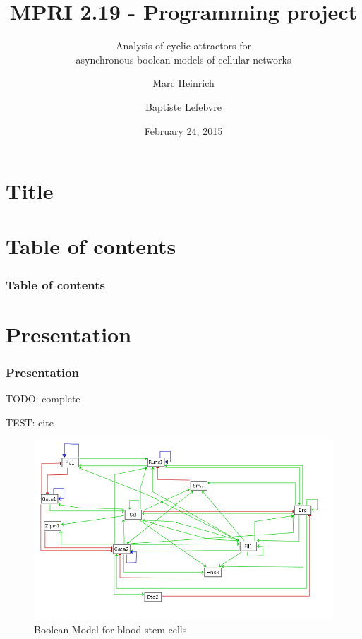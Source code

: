 \documentclass{beamer}
\title{MPRI 2.19 - Programming project}
\subtitle{Analysis of cyclic attractors for \\ asynchronous boolean models of cellular networks}
\author{Marc Heinrich \and Baptiste Lefebvre}
\institute{École Normale Supérieure, Computer Science Department}
\date{February 24, 2015}
\begin{document}
\section*{Title}

\begin{frame}
  \titlepage
\end{frame}


\section*{Table of contents}

\begin{frame}
  \frametitle{Table of contents}
  \tableofcontents
\end{frame} 



\section{Presentation}

\begin{frame}
  \frametitle{Presentation}    
  TODO: complete
  
  TEST: cite \cite{Bonzanni}
\end{frame}

\begin{frame}
  \begin{figure}
    \includegraphics[scale=0.4]{img/hematopoietic}
    \caption{Boolean Model for blood stem cells}
  \end{figure}
\end{frame}
\end{document}
